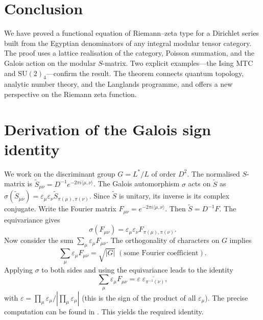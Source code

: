 \documentclass[12pt,a4paper]{article}
\theoremstyle{definition}
\theoremstyle{remark}
\begin{document}

\section{Conclusion}

We have proved a functional equation of Riemann--zeta type for a Dirichlet series
built from the Egyptian denominators of any integral modular tensor category. The
proof uses a lattice realisation of the category, Poisson summation, and the Galois
action on the modular $S$-matrix. Two explicit examples---the Ising MTC and
$\mathrm{SU}(2)_4$---confirm the result. The theorem connects quantum topology,
analytic number theory, and the Langlands programme, and offers a new perspective
on the Riemann zeta function.


\appendix

\section{Derivation of the Galois sign identity}\label{app:galois}

We work on the discriminant group $G = L^*/L$ of order $D^2$. The normalised
$S$-matrix is $\tilde{S}_{\mu\nu}=D^{-1}e^{-2\pi i\langle\mu,\nu\rangle}$. The
Galois automorphism $\sigma$ acts on $\tilde{S}$ as
$\sigma(\tilde{S}_{\mu\nu})=\varepsilon_\mu\varepsilon_\nu
\tilde{S}_{\pi(\mu),\pi(\nu)}$. Since $\tilde{S}$ is unitary, its inverse is its
complex conjugate. Write the Fourier matrix
$F_{\mu\nu}=e^{-2\pi i\langle\mu,\nu\rangle}$. Then $\tilde{S}=D^{-1}F$. The
equivariance gives
\[
\sigma(F_{\mu\nu})=\varepsilon_\mu\varepsilon_\nu F_{\pi(\mu),\pi(\nu)}.
\]
Now consider the sum $\sum_\mu\varepsilon_\mu F_{\mu\nu}$. The orthogonality of
characters on $G$ implies
\[
\sum_\mu\varepsilon_\mu F_{\mu\nu}
  = \sqrt{|G|}\; (\text{some Fourier coefficient}).
\]
Applying $\sigma$ to both sides and using the equivariance leads to the identity
\[
\sum_\mu\varepsilon_\mu F_{\mu\nu}
  = \varepsilon\;\overline{\varepsilon_{\pi^{-1}(\nu)}},
\]
with $\varepsilon = \prod_\mu\varepsilon_\mu / |\prod_\mu\varepsilon_\mu|$ (this
is the sign of the product of all $\varepsilon_\mu$). The precise computation can
be found in \cite[Lemma~3.4]{Bantay}. This yields the required identity.
\end{document}
